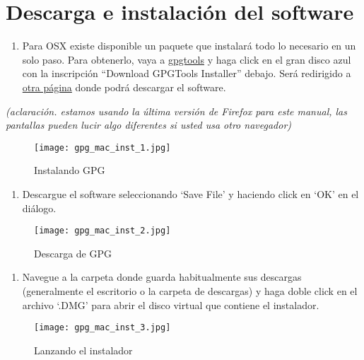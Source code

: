 \documentclass[10pt,a5paper,twoside,,]{book}
\providecommand{\tightlist}{%
  \setlength{\itemsep}{0pt}\setlength{\parskip}{0pt}}
\begin{document}
\section{Descarga e instalación del
software}\label{descarga-e-instalaciuxf3n-del-software}

\begin{enumerate}
\def\labelenumi{\arabic{enumi}.}
\tightlist
\item
  Para OSX existe disponible un paquete que instalará todo lo necesario
  en un solo paso. Para obtenerlo, vaya a
  \href{http://www.gpgtools.org/}{gpgtools} y haga click en el gran
  disco azul con la inscripción ``Download GPGTools Installer'' debajo.
  Será redirigido a
  \href{http://www.gpgtools.org/installer/index.html}{otra página} donde
  podrá descargar el software.
\end{enumerate}

\emph{(aclaración. estamos usando la última versión de Firefox para este
manual, las pantallas pueden lucir algo diferentes si usted usa otro
navegador)}

\begin{figure}[htbp]
\centering
\texttt{[image: gpg\_mac\_inst\_1.jpg]}
\caption{Instalando GPG}
\end{figure}

\begin{enumerate}
\def\labelenumi{\arabic{enumi}.}
\setcounter{enumi}{1}
\tightlist
\item
  Descargue el software seleccionando `Save File' y haciendo click en
  `OK' en el diálogo.
\end{enumerate}

\begin{figure}[htbp]
\centering
\texttt{[image: gpg\_mac\_inst\_2.jpg]}
\caption{Descarga de GPG}
\end{figure}

\begin{enumerate}
\def\labelenumi{\arabic{enumi}.}
\setcounter{enumi}{2}
\tightlist
\item
  Navegue a la carpeta donde guarda habitualmente sus descargas
  (generalmente el escritorio o la carpeta de descargas) y haga doble
  click en el archivo `.DMG' para abrir el disco virtual que contiene el
  instalador.
\end{enumerate}

\begin{figure}[htbp]
\centering
\texttt{[image: gpg\_mac\_inst\_3.jpg]}
\caption{Lanzando el instalador}
\end{figure}
\end{document}
